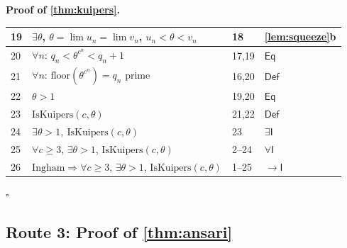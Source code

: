 \documentclass[11pt,reqno]{amsart}
\theoremstyle{blueplain}
\renewcommand{\qedsymbol}{\textcolor{proofqed}{\ensuremath{\square}}}
\renewenvironment{proof}[1][Proof]{\par\noindent\textbf{\textcolor{proofhead}{#1.}}\par\nobreak}{\par\nobreak\hfill\qedsymbol}
\numberwithin{equation}{section}
\begin{document}
\begin{proof}[\textbf{Proof of \cref{thm:kuipers}}]
{\begin{tabular}{|m{0.7cm}|m{12cm}|m{1.4cm}|m{2.5cm}|}
			19 & $\exists\theta$, $\theta=\lim u_n=\lim v_n$, $u_n<\theta<v_n$ & 18 & \cref{lem:squeeze}b \\ \hline
			20 & $\forall n$: $q_n<\theta^{c^{n}}<q_n+1$ & 17,19 & $\mathsf{Eq}$ \\ \hline
			21 & $\forall n$: $\mathrm{floor}(\theta^{c^{n}})=q_n$ prime & 16,20 & $\mathsf{Def}$ \\ \hline
			22 & $\theta>1$ & 19,20 & $\mathsf{Eq}$ \\ \hline
			23 & $\mathrm{IsKuipers}(c,\theta)$ & 21,22 & $\mathsf{Def}$ \\ \hline
			24 & $\exists\theta>1,\ \mathrm{IsKuipers}(c,\theta)$ & 23 & $\exists\mathsf{I}$ \\ \hline
			25 & $\forall c\ge 3$, $\exists\theta>1$, $\mathrm{IsKuipers}(c,\theta)$ & 2--24 & $\forall\mathsf{I}$ \\ \hline
			26 & $\text{Ingham}\Rightarrow\forall c\ge 3$, $\exists\theta>1$, $\mathrm{IsKuipers}(c,\theta)$ & 1--25 & $\rightarrow\mathsf{I}$ \\ \hline
		\end{tabular}
	}
\end{proof}

\subsection{Route 3: Proof of \cref{thm:ansari}}
\end{document}
